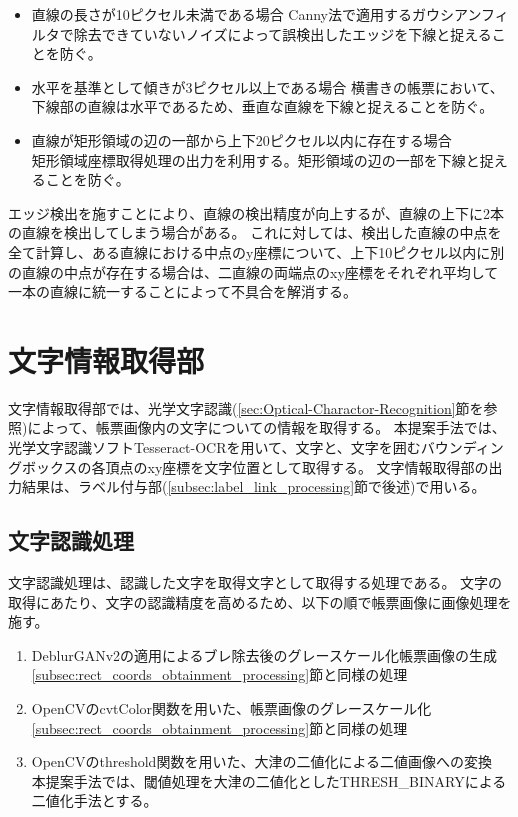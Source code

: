 \begin{itemize}
    \item 直線の長さが10ピクセル未満である場合
        Canny法で適用するガウシアンフィルタで除去できていないノイズによって誤検出したエッジを下線と捉えることを防ぐ。
    \item 水平を基準として傾きが3ピクセル以上である場合
        横書きの帳票において、下線部の直線は水平であるため、垂直な直線を下線と捉えることを防ぐ。
    \item 直線が矩形領域の辺の一部から上下20ピクセル以内に存在する場合\\
        矩形領域座標取得処理の出力を利用する。矩形領域の辺の一部を下線と捉えることを防ぐ。
\end{itemize}

エッジ検出を施すことにより、直線の検出精度が向上するが、直線の上下に2本の直線を検出してしまう場合がある。
これに対しては、検出した直線の中点を全て計算し、ある直線における中点のy座標について、上下10ピクセル以内に別の直線の中点が存在する場合は、二直線の両端点のxy座標をそれぞれ平均して一本の直線に統一することによって不具合を解消する。

\section{文字情報取得部}\label{sec:OCR_part}
文字情報取得部では、光学文字認識(\ref{sec:Optical-Charactor-Recognition}節を参照)によって、帳票画像内の文字についての情報を取得する。
本提案手法では、光学文字認識ソフトTesseract-OCRを用いて、文字と、文字を囲むバウンディングボックスの各頂点のxy座標を文字位置として取得する。
文字情報取得部の出力結果は、ラベル付与部(\ref{subsec:label_link_processing}節で後述)で用いる。

\subsection{文字認識処理}\label{subsec:char_recognition_processing}
文字認識処理は、認識した文字を取得文字として取得する処理である。
文字の取得にあたり、文字の認識精度を高めるため、以下の順で帳票画像に画像処理を施す。

\begin{enumerate}
    \item DeblurGANv2の適用によるブレ除去後のグレースケール化帳票画像の生成\\
        \ref{subsec:rect_coords_obtainment_processing}節と同様の処理
    \item OpenCVのcvtColor関数を用いた、帳票画像のグレースケール化\\
        \ref{subsec:rect_coords_obtainment_processing}節と同様の処理
    \item OpenCVのthreshold関数を用いた、大津の二値化による二値画像への変換\\
        本提案手法では、閾値処理を大津の二値化としたTHRESH\_BINARYによる二値化手法とする。
\end{enumerate}

